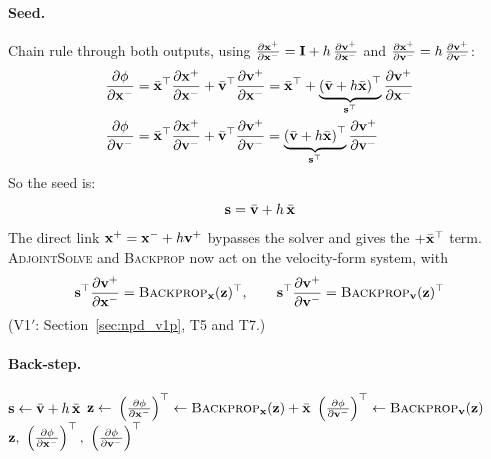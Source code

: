 \paragraph{Seed.} Chain rule through both outputs, using $\frac{\partial \mathbf{x}^+}{\partial \mathbf{x}^-} = \mathbf{I} + h\,\frac{\partial \mathbf{v}^+}{\partial \mathbf{x}^-}$ and $\frac{\partial \mathbf{x}^+}{\partial \mathbf{v}^-} = h\,\frac{\partial \mathbf{v}^+}{\partial \mathbf{v}^-}$:
\begin{align*}
    \frac{\partial \phi}{\partial \mathbf{x}^-} &= \bar{\mathbf{x}}^\top\frac{\partial \mathbf{x}^+}{\partial \mathbf{x}^-} + \bar{\mathbf{v}}^\top\frac{\partial \mathbf{v}^+}{\partial \mathbf{x}^-}
    = \bar{\mathbf{x}}^\top + \underbrace{\left(\bar{\mathbf{v}} + h\bar{\mathbf{x}}\right)^\top}_{\mathbf{s}^\top}\frac{\partial \mathbf{v}^+}{\partial \mathbf{x}^-} \\
    \frac{\partial \phi}{\partial \mathbf{v}^-} &= \bar{\mathbf{x}}^\top\frac{\partial \mathbf{x}^+}{\partial \mathbf{v}^-} + \bar{\mathbf{v}}^\top\frac{\partial \mathbf{v}^+}{\partial \mathbf{v}^-}
    = \underbrace{\left(\bar{\mathbf{v}} + h\bar{\mathbf{x}}\right)^\top}_{\mathbf{s}^\top}\frac{\partial \mathbf{v}^+}{\partial \mathbf{v}^-}
\end{align*}
\noindent So the seed is:
\[\mathbf{s} = \bar{\mathbf{v}} + h\,\bar{\mathbf{x}}\]
The direct link $\mathbf{x}^+ = \mathbf{x}^- + h\mathbf{v}^+$ bypasses the solver and gives the $+\bar{\mathbf{x}}^\top$ term. \textsc{AdjointSolve} and \textsc{Backprop} now act on the velocity-form system, with
\begin{equation*}
    \mathbf{s}^\top\frac{\partial \mathbf{v}^+}{\partial \mathbf{x}^-} = \textsc{Backprop}_{\mathbf{x}}(\mathbf{z})^\top,
    \qquad
    \mathbf{s}^\top\frac{\partial \mathbf{v}^+}{\partial \mathbf{v}^-} = \textsc{Backprop}_{\mathbf{v}}(\mathbf{z})^\top
\end{equation*}
(V1$'$: Section~\ref{sec:npd_v1p}, T5 and T7.)

\paragraph{Back-step.}
\begin{algorithm}[H]
\caption{Velocity-based: one back-step (\textsc{Backward} as in Alg.~\ref{alg:npd_pb_backstep}).}
\label{alg:npd_vb_backstep}
\begin{algorithmic}[1]
    \State $\mathbf{s} \gets \bar{\mathbf{v}} + h\,\bar{\mathbf{x}}$ 
    \State $\mathbf{z} \gets$  
    \State $\left(\frac{\partial \phi}{\partial \mathbf{x}^-}\right)^\top \gets \textsc{Backprop}_{\mathbf{x}}(\mathbf{z}) + \bar{\mathbf{x}}$ 
    \State $\left(\frac{\partial \phi}{\partial \mathbf{v}^-}\right)^\top \gets \textsc{Backprop}_{\mathbf{v}}(\mathbf{z})$ 
    \State \Return $\z,\ \left(\pdc{\phi}{\x^-}\right)^\top,\ \left(\pdc{\phi}{\vv^-}\right)^\top$
\EndFunction
\end{algorithmic}
\end{algorithm}

